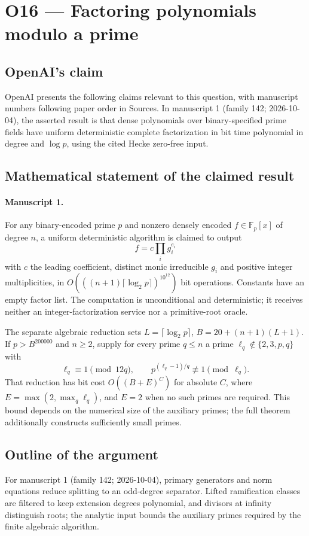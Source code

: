 \documentclass[11pt]{article}
\begin{document}
\section*{O16 — Factoring polynomials modulo a prime}

\subsection{OpenAI's claim}
OpenAI presents the following claims relevant to this question, with manuscript numbers following paper order in Sources. In manuscript 1 (family 142; 2026-10-04), the asserted result is that dense polynomials over binary-specified prime fields have uniform deterministic complete factorization in bit time polynomial in degree and $\log p$, using the cited Hecke zero-free input.

\subsection{Mathematical statement of the claimed result}
\paragraph{Manuscript 1.}
For any binary-encoded prime $p$ and nonzero densely encoded $f\in\mathbb F_p[x]$ of degree $n$, a uniform deterministic algorithm is claimed to output
\[
 f=c\prod_i g_i^{e_i}
\]
with $c$ the leading coefficient, distinct monic irreducible $g_i$ and positive integer multiplicities, in $O(((n+1)\lceil\log_2p\rceil)^{10^{12}})$ bit operations. Constants have an empty factor list. The computation is unconditional and deterministic; it receives neither an integer-factorization service nor a primitive-root oracle.

The separate algebraic reduction sets $L=\lceil\log_2p\rceil$, $B=20+(n+1)(L+1)$. If $p>B^{200000}$ and $n\ge2$, supply for every prime $q\le n$ a prime $\ell_q\notin\{2,3,p,q\}$ with
\[
 \ell_q\equiv1\pmod{12q},\qquad p^{(\ell_q-1)/q}\not\equiv1\pmod{\ell_q}.
\]
That reduction has bit cost $O((B+E)^C)$ for absolute $C$, where $E=\max(2,\max_q\ell_q)$, and $E=2$ when no such primes are required. This bound depends on the numerical size of the auxiliary primes; the full theorem additionally constructs sufficiently small primes.

\subsection{Outline of the argument}
For manuscript 1 (family 142; 2026-10-04), primary generators and norm equations reduce splitting to an odd-degree separator. Lifted ramification classes are filtered to keep extension degrees polynomial, and divisors at infinity distinguish roots; the analytic input bounds the auxiliary primes required by the finite algebraic algorithm.
\end{document}
